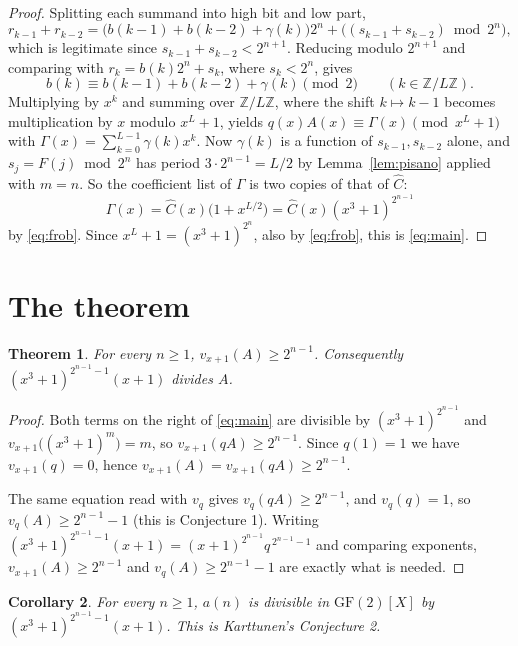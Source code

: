 \documentclass[11pt,a4paper]{article}
\theoremstyle{plain}
\newtheorem{theorem}{Theorem}
\newtheorem{corollary}[theorem]{Corollary}
\theoremstyle{definition}
\newcommand{\Chat}{\widehat{C}}
\begin{document}
\begin{proof}
Splitting each summand into high bit and low part,
\[
  r_{k-1}+r_{k-2}=\bigl(b(k-1)+b(k-2)+\gamma(k)\bigr)2^{n}
  +\bigl((s_{k-1}+s_{k-2})\bmod2^{n}\bigr),
\]
which is legitimate since $s_{k-1}+s_{k-2}<2^{n+1}$. Reducing modulo $2^{n+1}$ and
comparing with $r_{k}=b(k)2^{n}+s_{k}$, where $s_{k}<2^{n}$, gives
\[
  b(k)\equiv b(k-1)+b(k-2)+\gamma(k)\pmod2\qquad(k\in\mathbb{Z}/L\mathbb{Z}).
\]
Multiplying by $x^{k}$ and summing over $\mathbb{Z}/L\mathbb{Z}$, where the shift
$k\mapsto k-1$ becomes multiplication by $x$ modulo $x^{L}+1$, yields
$q(x)A(x)\equiv\Gamma(x)\pmod{x^{L}+1}$ with $\Gamma(x)=\sum_{k=0}^{L-1}\gamma(k)x^{k}$.
Now $\gamma(k)$ is a function of $s_{k-1},s_{k-2}$ alone, and $s_{j}=F(j)\bmod2^{n}$ has
period $3\cdot2^{n-1}=L/2$ by Lemma~\ref{lem:pisano} applied with $m=n$. So the coefficient
list of $\Gamma$ is two copies of that of $\Chat$:
\[
  \Gamma(x)=\Chat(x)\bigl(1+x^{L/2}\bigr)=\Chat(x)(x^{3}+1)^{2^{n-1}}
\]
by \eqref{eq:frob}. Since $x^{L}+1=(x^{3}+1)^{2^{n}}$, also by \eqref{eq:frob}, this is
\eqref{eq:main}.
\end{proof}

\section{The theorem}

\begin{theorem}\label{thm:main}
For every $n\ge1$, $v_{x+1}(A)\ge2^{n-1}$. Consequently $(x^{3}+1)^{2^{n-1}-1}(x+1)$
divides $A$.
\end{theorem}

\begin{proof}
Both terms on the right of \eqref{eq:main} are divisible by $(x^{3}+1)^{2^{n-1}}$ and
$v_{x+1}\bigl((x^{3}+1)^{m}\bigr)=m$, so $v_{x+1}(qA)\ge2^{n-1}$. Since $q(1)=1$ we have
$v_{x+1}(q)=0$, hence $v_{x+1}(A)=v_{x+1}(qA)\ge2^{n-1}$.

The same equation read with $v_{q}$ gives $v_{q}(qA)\ge2^{n-1}$, and $v_{q}(q)=1$, so
$v_{q}(A)\ge2^{n-1}-1$ (this is Conjecture 1). Writing
$(x^{3}+1)^{2^{n-1}-1}(x+1)=(x+1)^{2^{n-1}}q^{\,2^{n-1}-1}$ and comparing exponents,
$v_{x+1}(A)\ge2^{n-1}$ and $v_{q}(A)\ge2^{n-1}-1$ are exactly what is needed.
\end{proof}

\begin{corollary}
For every $n\ge1$, $a(n)$ is divisible in $\mathrm{GF}(2)[X]$ by
$(x^{3}+1)^{2^{n-1}-1}(x+1)$. This is Karttunen's Conjecture 2.
\end{corollary}
\end{document}
